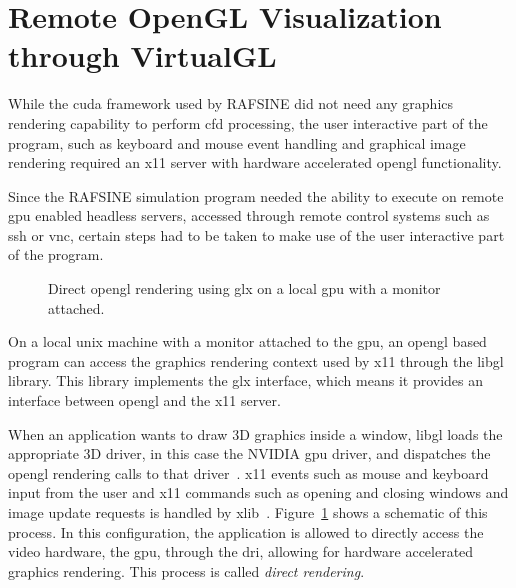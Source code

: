 \section{Remote OpenGL Visualization through VirtualGL}\label{sec:virtualgl}
While the \gls{cuda} framework used by RAFSINE did not need any graphics rendering capability to perform \gls{cfd} processing, the user interactive part of the program, such as keyboard and mouse event handling and graphical image rendering required an \gls{x11} server with hardware accelerated \gls{opengl} functionality.

Since the RAFSINE simulation program needed the ability to execute on remote \gls{gpu} enabled headless servers, accessed through remote control systems such as \gls{ssh} or \gls{vnc}, certain steps had to be taken to make use of the user interactive part of the program.

\begin{figure}[!htb]
\centering 
\begin{normalsize}
\def\svgwidth{0.7\linewidth}

\end{normalsize}
\caption{Direct \gls{opengl} rendering using \gls{glx} on a local \gls{gpu} with a monitor attached.\protect\footnotemark}
\label{fig:virtualgl_direct}
\end{figure}

On a local \gls{unix} machine with a monitor attached to the \gls{gpu}, an \gls{opengl} based program can access the graphics rendering context used by \gls{x11} through the \gls{libgl} library. This library implements the \gls{glx} interface, which means it provides an interface between \gls{opengl} and the \gls{x11} server. 

When an application wants to draw 3D graphics inside a window, \gls{libgl} loads the appropriate 3D driver, in this case the NVIDIA \gls{gpu} driver, and dispatches the \gls{opengl} rendering calls to that driver~\cite{libgl}. \gls{x11} events such as mouse and keyboard input from the user and \gls{x11} commands such as opening and closing windows and image update requests is handled by \gls{xlib}~\cite{xlib}. Figure~\ref{fig:virtualgl_direct} shows a schematic of this process. In this configuration, the application is allowed to directly access the video hardware, the \gls{gpu}, through the \gls{dri}, allowing for hardware accelerated graphics rendering. This process is called \textit{direct rendering}.

